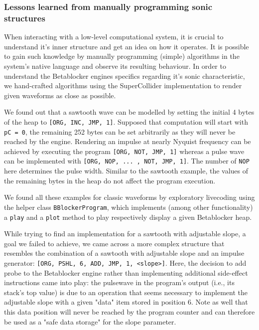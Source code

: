 \documentclass[letterpaper, 12pt]{article}
\begin{document}
\subsubsection{Lessons learned from manually programming sonic structures}
\label{sub:manual_programming_sonic_structures}

When interacting with a low-level computational system, it is crucial to  understand it's inner structure and get an idea on how it operates.
It is possible to gain such knowledge by manually programming (simple) algorithms in the system's native language and observe its resulting behaviour.
In order to understand the Betablocker engines specifics regarding it's sonic characteristic, we hand-crafted algorithms using the SuperCollider implementation to render given waveforms as close as possible.

We found out that a sawtooth wave can be modelled by setting the initial 4 bytes of the heap to
\texttt{[ORG, INC, JMP, 1]}.
Supposed that computation will start with \texttt{pC = 0}, the remaining 252 bytes can be set arbitrarily as they will never be reached by the engine.
Rendering an impulse at nearly Nyquist frequency can be achieved by executing the program \texttt{[ORG, NOT, JMP, 1]} whereas a pulse wave can be implemented with \texttt{[ORG, NOP, ... , NOT, JMP, 1]}.
The number of \texttt{NOP} here determines the pulse width.
Similar to the sawtooth example, the values of the remaining bytes in the heap do not affect the program execution.

We found all these examples for classic waveforms by exploratory livecoding using the helper class \texttt{BBlockerProgram}, which implements (among other functionality) a \texttt{play} and a \texttt{plot} method to play respectively display a given Betablocker heap.

While trying to find an implementation for a sawtooth with adjustable slope, a goal we failed to achieve, we came across a more complex structure that resembles the combination of a sawtooth with adjustable slope and an impulse generator: \texttt{[ORG, PSHL, 6, ADD, JMP, 1, <slope>]}. 
Here, the decision to add probe to the Betablocker engine rather than implementing additional side-effect instructions came into play: the pulsewave in the program's output (i.e., its stack's top value) is due to an operation that seems necessary to implement the adjustable slope with a given "data" item stored in position 6.
Note as well that this data position will never be reached by the program counter and can therefore be used as a "safe data storage" for the slope parameter.
\end{document}
